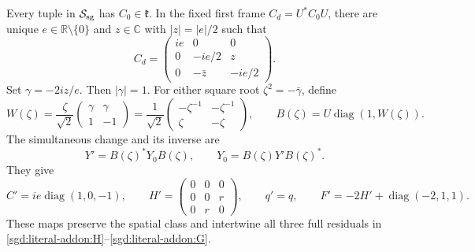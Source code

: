 \begin{lemma}
\label{sgd:literal-addon:temporal}
Every tuple in $\mathcal S_{\rm sg}$ has $C_0\in\mathfrak k$.
In the fixed first frame $C_d=U^*C_0U$, there are unique
$e\in\mathbb R\setminus\{0\}$ and $z\in\mathbb C$ with
$|z|=|e|/2$ such that
\[
 C_d=\begin{pmatrix}
 ie&0&0\\0&-ie/2&z\\0&-\bar z&-ie/2
 \end{pmatrix}.
\]
Set $\gamma=-2iz/e$. Then $|\gamma|=1$. For either square root
$\zeta^2=-\bar\gamma$, define
\[
 W(\zeta)=\frac{\zeta}{\sqrt2}
 \begin{pmatrix}\gamma&\gamma\\1&-1\end{pmatrix}
 =\frac1{\sqrt2}
 \begin{pmatrix}-\zeta^{-1}&-\zeta^{-1}\\\zeta&-\zeta\end{pmatrix},
 \qquad B(\zeta)=U\operatorname{diag}(1,W(\zeta)).
\]
The simultaneous change and its inverse are
\begin{equation}
 Y'=B(\zeta)^*Y_0B(\zeta),\qquad
 Y_0=B(\zeta)Y'B(\zeta)^*.
 \label{sgd:literal-addon:frame}
\end{equation}
They give
\[
 C'=ie\operatorname{diag}(1,0,-1),\qquad
 H'=\begin{pmatrix}0&0&0\\0&0&r\\0&r&0\end{pmatrix},\qquad
 q'=q,\qquad F'=-2H'+\operatorname{diag}(-2,1,1).
\]
These maps preserve the spatial class and intertwine all three full
residuals in \eqref{sgd:literal-addon:H}--\eqref{sgd:literal-addon:G}.
\end{lemma}

